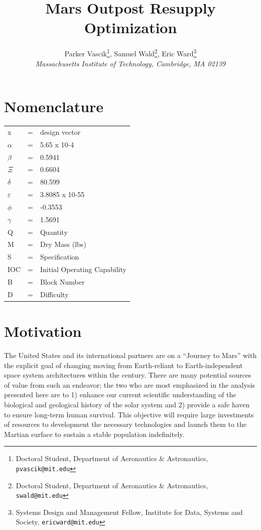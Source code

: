 \documentclass[]{aiaa-pretty}
\author[Vascik, Wald, and Ward]{ %
Parker Vascik\thanks{Doctoral Student, Department of Aeronautics \& Astronautics, \texttt{pvascik@mit.edu}},
Samuel Wald\thanks{Doctoral Student, Department of Aeronautics \& Astronautics, \texttt{swald@mit.edu}},
Eric Ward\thanks{Systems Design and Management Fellow, Institute for Data, Systems and Society, \texttt{ericward@mit.edu}}\\
\textit{Massachusetts Institute of Technology, Cambridge, MA 02139}}
\title{Mars Outpost Resupply Optimization}
\begin{document}
\maketitle

\section{Nomenclature}
\begin{table}[]
\centering
\label{tab:Nom}
\begin{tabular}{lll}
x   & = & design vector                \\
\( \alpha \)   & = & 5.65 x 10-4                  \\
\( \beta \)   & = & 0.5941                       \\
\( \Xi \)   & = & 0.6604                       \\
\( \delta \)   & = & 80.599                       \\
\( \varepsilon \)   & = & 3.8085 x 10-55               \\
\( \phi \)   & = & -0.3553                      \\
\( \gamma \)   & = & 1.5691                       \\
Q   & = & Quantity                     \\
M   & = & Dry Mass (lbs)               \\
S   & = & Specification                \\
IOC & = & Initial Operating Capability \\
B   & = & Block Number                 \\
D   & = & Difficulty                  
\end{tabular}
\end{table}


\section{Motivation}
\label{sec:Motivation}
The United States and its international partners are on a “Journey to Mars” with the explicit goal of changing moving from Earth-reliant to Earth-independent space system architectures within the century. \cite{craig2015pioneering} There are many potential sources of value from such an endeavor; the two who are most emphasized in the analysis presented here are to 1) enhance our current scientific understanding of the biological and geological history of the solar system and 2) provide a safe haven to ensure long-term human survival. \cite{NRC2014} This objective will require large investments of resources to development the necessary technologies and launch them to the Martian surface to sustain a stable population indefinitely. 
\end{document}
